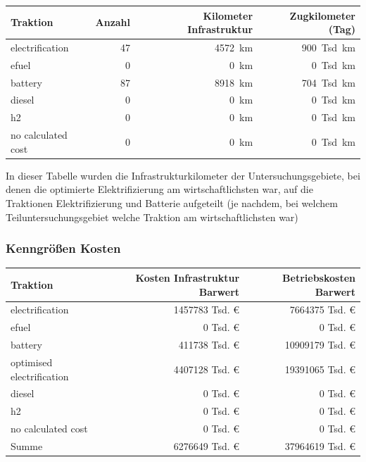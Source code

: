 \begin{center}
	\begin{tabularx}{\textwidth}{X | r | r | r} Traktion & Anzahl & Kilometer Infrastruktur & Zugkilometer (Tag) \\
	\hline
            electrification & \num{47} &  \SI{4572}{\km} & \SI{900}{Tsd. \km}\\
            efuel & \num{0} &  \SI{0}{\km} & \SI{0}{Tsd. \km}\\
            battery & \num{87} &  \SI{8918}{\km} & \SI{704}{Tsd. \km}\\
            diesel & \num{0} &  \SI{0}{\km} & \SI{0}{Tsd. \km}\\
            h2 & \num{0} &  \SI{0}{\km} & \SI{0}{Tsd. \km}\\
            no calculated cost & \num{0} &  \SI{0}{\km} & \SI{0}{Tsd. \km}\\
    	\end{tabularx}
\end{center}
In dieser Tabelle wurden die Infrastrukturkilometer der Untersuchungsgebiete, bei denen die optimierte Elektrifizierung am wirtschaftlichsten war, auf die Traktionen Elektrifizierung und Batterie aufgeteilt (je nachdem, bei welchem Teiluntersuchungsgebiet welche Traktion am wirtschaftlichsten war)

\subsubsection{Kenngrößen Kosten}

\begin{center}
	\begin{tabularx}{\textwidth}{X | r | r} Traktion & Kosten Infrastruktur Barwert & Betriebskosten Barwert\\
	\hline
            electrification & \num{1457783} Tsd. € &  \num{7664375} Tsd. €\\
            efuel & \num{0} Tsd. € &  \num{0} Tsd. €\\
            battery & \num{411738} Tsd. € &  \num{10909179} Tsd. €\\
            optimised electrification & \num{4407128} Tsd. € &  \num{19391065} Tsd. €\\
            diesel & \num{0} Tsd. € &  \num{0} Tsd. €\\
            h2 & \num{0} Tsd. € &  \num{0} Tsd. €\\
            no calculated cost & \num{0} Tsd. € &  \num{0} Tsd. €\\
    	\hline
		Summe & \num{6276649} Tsd. € & \num{37964619} Tsd. €
	\end{tabularx}
\end{center}

